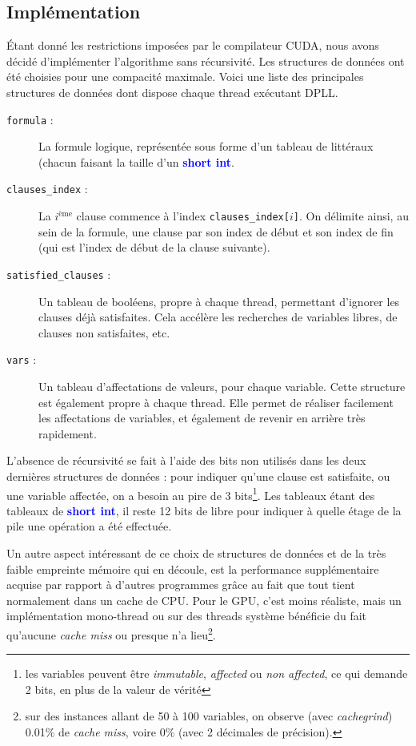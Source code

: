 \documentclass{article}
\newcommand{\keyword}[1]{\textbf{\textcolor{blue}{#1}}}
\newcommand{\code}[1]{\texttt{{#1}}}
\newcommand{\cuda}{\textsc{CUDA}}
\begin{document}
\subsection{Implémentation}
Étant donné les restrictions imposées par le compilateur \cuda, nous avons décidé d'implémenter l'algorithme sans récursivité. Les structures de données ont été choisies pour une compacité maximale. Voici une liste des principales structures de données dont dispose chaque thread exécutant \textsc{DPLL}.
\begin{description}
    \item[\code{formula} :] La formule logique, représentée sous forme d'un tableau de littéraux (chacun faisant la taille d'un \keyword{short int}.
    \item[\code{clauses\_index} :] La $i^{\textrm{ème}}$ clause commence à l'index \code{clauses\_index[$i$]}. On délimite ainsi, au sein de la formule, une clause par son index de début et son index de fin (qui est l'index de début de la clause suivante).
    \item[\code{satisfied\_clauses} :] Un tableau de booléens, propre à chaque thread, permettant d'ignorer les clauses déjà satisfaites. Cela accélère les recherches de variables libres, de clauses non satisfaites, etc.
    \item[\code{vars} :] Un tableau d'affectations de valeurs, pour chaque variable. Cette structure est également propre à chaque thread. Elle permet de réaliser facilement les affectations de variables, et également de revenir en arrière très rapidement.
\end{description}

L'absence de récursivité se fait à l'aide des bits non utilisés dans les deux dernières structures de données : pour indiquer qu'une clause est satisfaite, ou une variable affectée, on a besoin au pire de 3 bits\footnote{les variables peuvent être \emph{immutable}, \emph{affected} ou \emph{non affected}, ce qui demande 2 bits, en plus de la valeur de vérité}. Les tableaux étant des tableaux de \keyword{short int}, il reste 12 bits de libre pour indiquer à quelle étage de la pile une opération a été effectuée.

Un autre aspect intéressant de ce choix de structures de données et de la très faible empreinte mémoire qui en découle, est la performance supplémentaire acquise par rapport à d'autres programmes grâce au fait que tout tient normalement dans un cache de CPU. Pour le GPU, c'est moins réaliste, mais un implémentation mono-thread ou sur des threads système bénéficie du fait qu'aucune \emph{cache miss} ou presque n'a lieu\footnote{sur des instances allant de 50 à 100 variables, on observe (avec \emph{cachegrind}) 0.01\% de \emph{cache miss}, voire 0\% (avec 2 décimales de précision).}.
\end{document}
